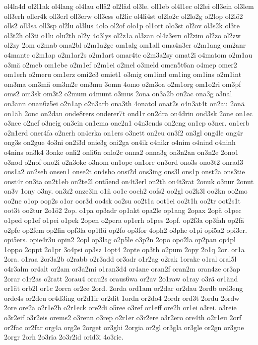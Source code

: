 {ol4la4d
ol2l1ak
ol4lang
ol4lau
ollä2
ol2läd
ol3le.
oll1eb
ol4l1ec
ol2lei
oll3ein
ol3lem
oll3erh
oller4k
oll3erl
oll3erw
oll3ess
ol2lic
ol4li4st
ol2lo2c
ol2lo2g
ol2lop
ol2lö2
olls2
oll3sa
oll3sp
ol2lu
ol3lus
4olo
ol2of
olo1p
ol1ort
olo3st
ol2ov
ol3s2k
ol3te
ol3t2h
ol3ti
o1lu
olu2th
ol2y
4o3lys
ol2z1a
ol3zan
ol4z3ern
ol2zim
ol2zo
ol2zw
ol2zy
2om
o2mab
oma2bl
o2m1a2ge
om1alg
om1all
oma4n3er
o2m1ang
om2anr
o4mante
o2m1ap
o2m1ar2s
o2m1art
omar4te
o2m3a2sy
omat2i
o4matom
o2m1au
o3mä
o2meb
om1ebe
o2m1ef
o2m1ei
o2mel
o3meld
omen5t6an
o4mep
omer2
om1erh
o2meru
om1erz
omi2c3
omiet1
o3mig
om1ind
om1ing
om1ins
o2m1int
om3ma
om3mä
om3m2e
om3mu
3omn
4omo
o2m3oa
o2m1org
om1o2ri
om3pf
oms2
om3sk
om3t2
o2mum
o4munt
o3mus
2ona
on3a2b
on2ac
ona3g
o3nal
on3ann
onan6z5ei
o2n1ap
o2n3arb
ona3th
4onatol
onat2s
o4n3at4t
on2au
2onä
on1äh
2onc
on2dan
onde8rers
onderer7t
ond1r
on2dra
on4drin
ond3sk
2one
on1ec
o3nee
o2nef
o3neig
on3ein
on1ema
one2n1
o4n3ends
on2eng
on1ep
o3ner.
on1erb
o2n1erd
oner4fa
o2nerh
on4erka
on1ers
o3nett
on2eu
on3f2
on3gl
ong4le
ong4r
ong3s
on2gue
4o3ni
on2i3d
onie3g
oni2ga
on4ik
o4nikr
o4nim
o4nind
o4ninh
o4nins
on3k4
3onke
onli2
onli6n
onlo2c
onna2
onna3g
on3n2an
on3n2e
2ono1
o3nod
o2nof
ono2i
o2n3oke
o3nom
on1ope
on1orc
on3ord
ono3s
ono3t2
onrad3
ons1a2
on2seb
onsen1
onse2t
on4sho
onsi2d
ons3ing
ons3l
ons1p
onst2a
ons3tie
onst4r
on3ta
on2t1eb
on2te2l
ont5end
on4t3erl
on2th
on4t3rat
2onuk
o3nur
2onut
on3v
1ony
o3ny.
on3z2
onze3in
o1ñ
oo1c
ooch2
oofs2
oo2gl
oo2k3l
oo2kn
oo2mo
oo2ne
o1op
oop2s
o1or
oor3d
oo4sk
oo2su
oo2t1a
oot1ei
oo2t1h
oo2tr
oot2s1t
oot3t
oo2tur
2o1ö2
2op.
o1pa
op3adr
op1akt
opa2le
op1ang
2opax
2opä
o1pec
o1ped
op1ef
o1pei
o1pek
2open
o2pera
op1erh
o1pes
2opf.
op2f3a
op3fah
op2fä
o2pfe
op2fem
op2fin
opf3la
op1flü
op2fo
op3for
4oph2
o3phe
o1pi
opi5a2
opi3er.
opi5ers.
opie4r3u
opin2
2opl
op3lag
o2p5le
o3p2n
2opo
opo2la
op2pan
op4pl
1oppo
2oppt
2o1pr
3o4psi
op3sz
1opt4
2opte
op3th
o2pum
2opy
2o1q
2or.
or1a
2ora.
o1raa
2or3a2b
o2rabb
o2r3add
or3adr
o1r2ag
o2rak
1orake
o1ral
oral5l
o4r3alm
or4alt
or2am
or3a2mi
o1ran3d4
or4ane
oran2f
oran2m
oran4ze
or3ap
2orar
o1r2as
o2ratt
2orau4
orau2s
oraus6wa
or2av
2o1raw
o1ray
o3rä
or1änd
or1ät
orb2l
or1c
2orca
or2ce
2ord.
2orda
ord1am
or2dar
or2dau
2ordb
ord3eng
orde4s
or2deu
or4d3ing
or2d1ir
or2dit
1ordn
or2do4
2ordr
ord3t
2ordu
2ordw
2ore
ore2a
o2r1e2b
o2r1eck
ore2di
o5ree
o3ref
or1eff
ore2h
or1ei
o3rei.
o3reie
o3r2eif
o3r2eis
orems2
o3renn
o3rep
o2r1er
o3r2ere
o3r2ero
ore4th
o2r1eu
2orf
or2fac
or2far
org4a
org2e
2orget
or3ghi
2orgia
or2gl
or3gla
or3gle
or2gn
or3gne
2orgr
2orh
2o3ria
2o3r2id
orid3i
4o3rie.
}
